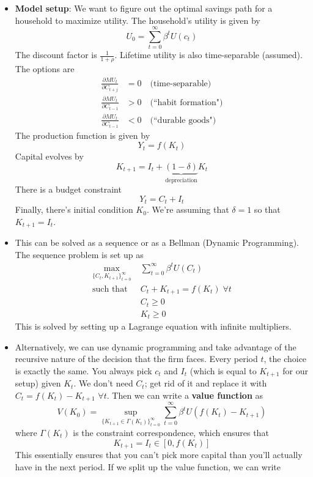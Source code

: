 \documentclass[12pt]{article}
\begin{document}
\begin{itemize}
    \item \textbf{Model setup}: We want to figure out the optimal savings path for a household to maximize utility. The household's utility is given by
    \[U_0 = \sum_{t=0}^{\infty} \beta^tU(c_t)\]
    The discount factor is $\frac{1}{1+\rho}$. Lifetime utility is also time-separable (assumed). The options are
    \[\begin{split}
        \frac{\partial MU_t}{\partial C_{t+j}} &= 0 \quad \text{(time-separable)} \\
        \frac{\partial MU_t}{\partial C_{t-1}} &> 0 \quad \text{(``habit formation")} \\
        \frac{\partial MU_t}{\partial C_{t-1}} &< 0 \quad \text{(``durable goods")}
    \end{split}\]
    The production function is given by
    \[Y_t = f(K_t)\]
    Capital evolves by
    \[K_{t+1} = I_t + \underbrace{(1-\delta)}_{\text{depreciation}}K_t\]
    There is a budget constraint
    \[Y_t = C_t + I_t\]
    Finally, there's initial condition $K_0$. We're assuming that $\delta = 1$ so that $K_{t+1} = I_t$.
    \item This can be solved as a sequence or as a Bellman (Dynamic Programming). The sequence problem is set up as
    \[\begin{split}
        \max_{\{C_t, K_{t+1}\}_{t=0}^{\infty}}\; &\sum_{t=0}^{\infty} \beta^tU(C_t) \\
        \text{such that} \; &C_t + K_{t+1} = f(K_t)\; \forall t \\
        &C_t \geq 0 \\
        &K_t \geq 0
    \end{split}\]
    This is solved by setting up a Lagrange equation with infinite multipliers. 
    \item Alternatively, we can use dynamic programming and take advantage of the recursive nature of the decision that the firm faces. Every period $t$, the choice is exactly the same. You always pick $c_t$ and $I_t$ (which is equal to $K_{t+1}$ for our setup) given $K_t$. We don't need $C_t$; get rid of it and replace it with $C_t = f(K_t) - K_{t+1}$ $\forall t$. Then we can write a \textbf{value function} as 
    \[V(K_0) = \sup_{\{K_{t+1} \in \Gamma(K_t)\}_{t=0}^{\infty}}\sum_{t=0}^{\infty} \beta^tU(f(K_t) - K_{t+1})\]
    where $\Gamma(K_t)$ is the constraint correspondence, which ensures that
    \[K_{t+1} = I_t \in [0, f(K_t)]\]
    This essentially ensures that you can't pick more capital than you'll actually have in the next period. If we split up the value function, we can write

\end{itemize}
\end{document}
